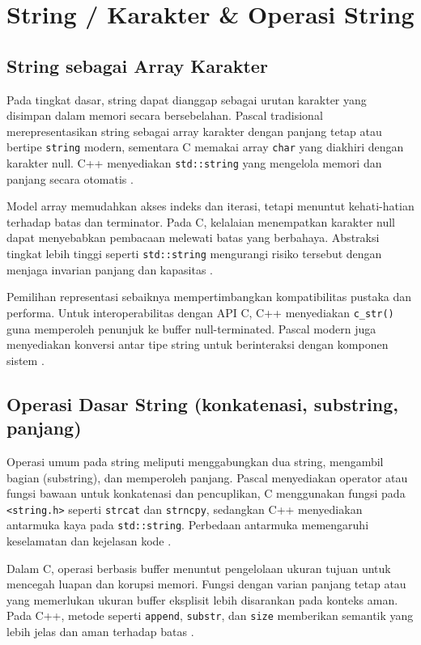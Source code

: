 \documentclass[../main.tex]{subfiles}
\begin{document}
\chapter{String / Karakter \& Operasi String}
\section{String sebagai Array Karakter}
Pada tingkat dasar, string dapat dianggap sebagai urutan karakter yang disimpan dalam memori secara bersebelahan. Pascal tradisional merepresentasikan string sebagai array karakter dengan panjang tetap atau bertipe \texttt{string} modern, sementara C memakai array \texttt{char} yang diakhiri dengan karakter null. C++ menyediakan \texttt{std::string} yang mengelola memori dan panjang secara otomatis \parencite{pascal-tutorial-wikibooks,iso-c-draft-n1570,cpp-strings}.

Model array memudahkan akses indeks dan iterasi, tetapi menuntut kehati-hatian terhadap batas dan terminator. Pada C, kelalaian menempatkan karakter null dapat menyebabkan pembacaan melewati batas yang berbahaya. Abstraksi tingkat lebih tinggi seperti \texttt{std::string} mengurangi risiko tersebut dengan menjaga invarian panjang dan kapasitas \parencite{cpp-strings}.

Pemilihan representasi sebaiknya mempertimbangkan kompatibilitas pustaka dan performa. Untuk interoperabilitas dengan API C, C++ menyediakan \texttt{c\_str()} guna memperoleh penunjuk ke buffer null-terminated. Pascal modern juga menyediakan konversi antar tipe string untuk berinteraksi dengan komponen sistem \parencite{free-pascal-docs}.

\section{Operasi Dasar String (konkatenasi, substring, panjang)}
Operasi umum pada string meliputi menggabungkan dua string, mengambil bagian (substring), dan memperoleh panjang. Pascal menyediakan operator atau fungsi bawaan untuk konkatenasi dan pencuplikan, C menggunakan fungsi pada \texttt{<string.h>} seperti \texttt{strcat} dan \texttt{strncpy}, sedangkan C++ menyediakan antarmuka kaya pada \texttt{std::string}. Perbedaan antarmuka memengaruhi keselamatan dan kejelasan kode \parencite{c-strings-h,cpp-strings,free-pascal-docs}.

Dalam C, operasi berbasis buffer menuntut pengelolaan ukuran tujuan untuk mencegah luapan dan korupsi memori. Fungsi dengan varian panjang tetap atau yang memerlukan ukuran buffer eksplisit lebih disarankan pada konteks aman. Pada C++, metode seperti \texttt{append}, \texttt{substr}, dan \texttt{size} memberikan semantik yang lebih jelas dan aman terhadap batas \parencite{cpp-strings}.
\end{document}
